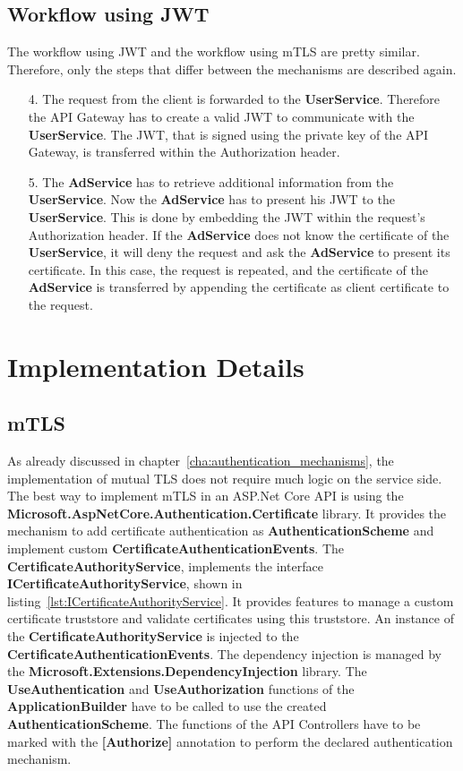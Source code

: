 \subsection{Workflow using JWT}
The workflow using JWT and the workflow using mTLS are pretty similar.
Therefore, only the steps that differ between the mechanisms are described again.
\begin{enumerate}
	\item[4.] The request from the client is forwarded to the \textbf{UserService}. 
		Therefore the API Gateway has to create a valid JWT to communicate with the \textbf{UserService}.
		The JWT, that is signed using the private key of the API Gateway, is transferred within the Authorization header.
	\item[5.] The \textbf{AdService} has to retrieve additional information from the \textbf{UserService}.
		Now the \textbf{AdService} has to present his JWT to the \textbf{UserService}.
		This is done by embedding the JWT within the request's Authorization header.
		If the \textbf{AdService} does not know the certificate of the \textbf{UserService}, it will deny the request and ask the \textbf{AdService} to present its certificate.
		In this case, the request is repeated, and the certificate of the \textbf{AdService} is transferred by appending the certificate as client certificate to the request.
\end{enumerate}

\section{Implementation Details}

\subsection{mTLS} \label{sec:impl_details_mtls}
As already discussed in chapter~\ref{cha:authentication_mechanisms}, the implementation of mutual TLS does not require much logic on the service side.
The best way to implement mTLS in an ASP.Net Core API is using the \textbf{Microsoft.AspNetCore.Authentication.Certificate} library.
It provides the mechanism to add certificate authentication as \textbf{AuthenticationScheme} and implement custom \textbf{CertificateAuthenticationEvents}.
The \textbf{CertificateAuthorityService}, implements the interface \textbf{ICertificateAuthorityService}, shown in listing~\ref{lst:ICertificateAuthorityService}.
It provides features to manage a custom certificate truststore and validate certificates using this truststore.
An instance of the \textbf{CertificateAuthorityService} is injected to the \textbf{CertificateAuthenticationEvents}.
The dependency injection is managed by the \textbf{Microsoft.Extensions.DependencyInjection} library.
The \textbf{UseAuthentication} and \textbf{UseAuthorization} functions of the \textbf{ApplicationBuilder} have to be called to use the created \textbf{AuthenticationScheme}.
The functions of the API Controllers have to be marked with the \textbf{[Authorize]} annotation to perform the declared authentication mechanism.

